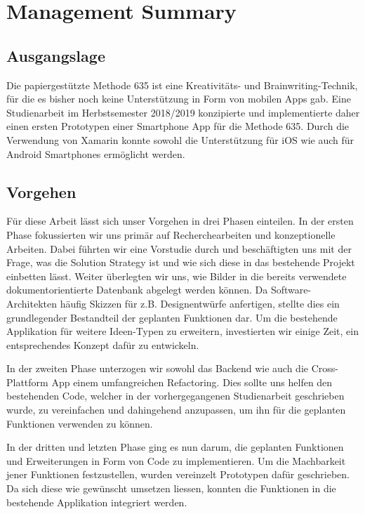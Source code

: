 \section{Management Summary}

\subsection{Ausgangslage}
Die papiergestützte Methode 635 ist eine Kreativitäts- und Brainwriting-Technik, für die es bisher noch keine Unterstützung in Form von mobilen Apps gab. Eine Studienarbeit im Herbstsemester 2018/2019 konzipierte und implementierte daher einen ersten Prototypen einer Smartphone App für die Methode 635. Durch die Verwendung von Xamarin konnte sowohl die Unterstützung für iOS wie auch für Android Smartphones ermöglicht werden.

\subsection{Vorgehen}
Für diese Arbeit lässt sich unser Vorgehen in drei Phasen einteilen. In der ersten Phase fokussierten wir uns primär auf Recherchearbeiten und konzeptionelle Arbeiten. Dabei führten wir eine Vorstudie durch und beschäftigten uns mit der Frage, was die Solution Strategy ist und wie sich diese in das bestehende Projekt einbetten lässt. Weiter überlegten wir uns, wie Bilder in die bereits verwendete dokumentorientierte Datenbank abgelegt werden können. Da Software-Architekten häufig Skizzen für z.B. Designentwürfe anfertigen, stellte dies ein grundlegender Bestandteil der geplanten Funktionen dar. Um die bestehende Applikation für weitere Ideen-Typen zu erweitern, investierten wir einige Zeit, ein entsprechendes Konzept dafür zu entwickeln.

In der zweiten Phase unterzogen wir sowohl das Backend wie auch die Cross-Plattform App einem umfangreichen Refactoring. Dies sollte uns helfen den bestehenden Code, welcher in der vorhergegangenen Studienarbeit geschrieben wurde, zu vereinfachen und dahingehend anzupassen, um ihn für die geplanten Funktionen verwenden zu können.

In der dritten und letzten Phase ging es nun darum, die geplanten Funktionen und Erweiterungen in Form von Code zu implementieren. Um die Machbarkeit jener Funktionen festzustellen, wurden vereinzelt Prototypen dafür geschrieben. Da sich diese wie gewünscht umsetzen liessen, konnten die Funktionen in die bestehende Applikation integriert werden. 

